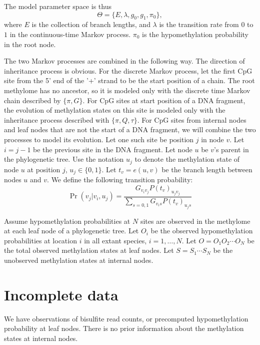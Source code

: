 \documentclass[11pt]{article}
\begin{document}
The model parameter space is thus $$\Theta=\{E,\lambda, g_0, g_1,
\pi_0\},$$ where $E$ is the collection of branch lengths, and
$\lambda$ is the transition rate from $0$ to $1$ in the
continuous-time Markov process. $\pi_0$ is the hypomethylation
probability in the root node.


The two Markov processes are combined in the following way. The
direction of inheritance process is obvious. For the discrete Markov
process, let the first CpG site from the 5' end of the '+' strand to
be the start position of a chain. The root methylome has no ancestor,
so it is modeled only with the discrete time Markov chain described by
$\{\pi, G\}$. For CpG sites at start position of a DNA fragment, the
evolution of methylation states on this site is modeled only with the
inheritance process described with $\{\pi, Q, \tau\}$. For CpG sites
from internal nodes and leaf nodes that are not the start of a DNA
fragment, we will combine the two processes to model its evolution. Let
one such site be position $j$ in node $v$. Let $i=j-1$ be the previous
site in the DNA fragment. Let node $u$ be $v$'s parent in the
phylogenetic tree. Use the notation $u_j$ to denote the methylation state
of node $u$ at position $j$, $u_j\in\{0,1\}$. Let $t_v=e(u,v)$ be the
branch length between nodes $u$ and $v$. We define the following
transition probability:
\begin{equation}
\Pr(v_j|v_i,u_j)=  \frac{G_{v_iv_j}P(t_v)_{u_jv_j}}{\sum_{s=0,1}G_{v_is}P(t_v)_{u_js}}
\end{equation}

Assume hypomethylation probabilities at $N$ sites are observed in the
methylome at each leaf node of a phylogenetic tree. Let $O_i$ be the
observed hypomethylation probabilities at location $i$ in all extant
species, $i=1,\ldots, N$. Let $O=O_1O_2\cdots O_N$ be the total
observed methylation states at leaf nodes.  Let $S=S_1\cdots S_N$ be
the unobserved methylation states at internal nodes.

\section{Incomplete data}
We have observations of bisulfite read counts, or precomputed
hypomethylation probability at leaf nodes. There is no prior
information about the methylation states at internal nodes.
\end{document}
